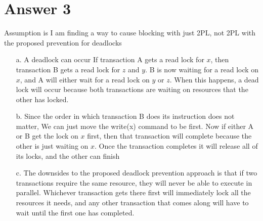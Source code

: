 \documentclass[11pt]{article}
\theoremstyle{definition}
\begin{document}
\section*{Answer 3}
Assumption is I am finding a way to cause blocking with just 2PL, not 2PL with the proposed prevention for deadlocks\\
\begin{enumerate}
  \item [a.] A deadlock can occur If transaction A gets a read lock for $x$, then transaction B gets a read lock for $z$ and $y$.  B is now waiting for a read lock on $x$, and A will either wait for a read lock on $y$ or $z$.  When this happens, a dead lock will occur because both transactions are waiting on resources that the other has locked.

  \item[b.] Since the order in which transaction B does its instruction does not matter, We can just move the write(x) command to be first.  Now if either A or B get the lock on $x$ first, then that transaction will complete because the other is just waiting on $x$.  Once the transaction completes it will release all of its locks, and the other can finish

  \item[c.] The downsides to the proposed deadlock prevention approach is that if two transactions require the same resource, they will never be able to execute in parallel.  Whichever transaction gets there first will immediately lock all the resources it needs, and any other transaction that comes along will have to wait until the first one has completed.
\end{enumerate}
\end{document}
